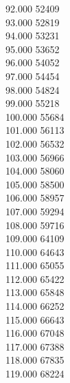 { 92.000	52409 \\
 93.000	52819 \\
 94.000	53231 \\
 95.000	53652 \\
 96.000	54052 \\
 97.000	54454 \\
 98.000	54824 \\
 99.000	55218 \\
 100.000	55684 \\
 101.000	56113 \\
 102.000	56532 \\
 103.000	56966 \\
 104.000	58060 \\
 105.000	58500 \\
 106.000	58957 \\
 107.000	59294 \\
 108.000	59716 \\
 109.000	64109 \\
 110.000	64643 \\
 111.000	65055 \\
 112.000	65422 \\
 113.000	65848 \\
 114.000	66252 \\
 115.000	66643 \\
 116.000	67048 \\
 117.000	67388 \\
 118.000	67835 \\
 119.000	68224 \\
}
